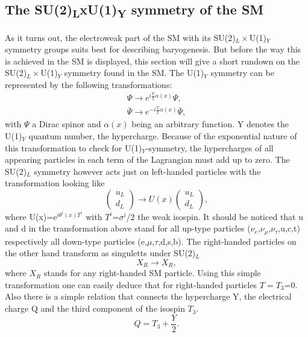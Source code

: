 \subsection{The SU(2)\textsubscript{L}xU(1)\textsubscript{Y} symmetry of the SM}
As it turns out, the electroweak part of the SM with its SU(2)$_L\times$U(1)$_Y$ symmetry groups suits best for describing baryogenesis. But before the way this is achieved in the SM is displayed, this section will give a short rundown on the SU(2)$_L\times$U(1)$_Y$ symmetry found in the SM.\newline\indent
The U(1)$_Y$ symmetry can be represented by the following transformations:
\begin{align*}
\Psi \longrightarrow e^{i\frac{Y}{2}\alpha(x)}\Psi,\\
\bar{\Psi} \longrightarrow e^{-i\frac{Y}{2}\alpha(x)}\bar{\Psi},
\end{align*}
with $\Psi$ a Dirac spinor and $\alpha(x)$ being an arbitrary function. Y denotes the U(1)$_Y$ quantum number, the hypercharge. Because of the exponential nature of this transformation to check for U(1)$_Y$-symmetry, the hypercharges of all appearing particles in each term of the Lagrangian must add up to zero. \newline\indent
The SU(2)$_L$ symmetry however acts just on left-handed particles with the transformation looking like
\begin{equation*}
	\left(\begin{array}{c}u_L\\d_L\end{array}\right)\longrightarrow U(x)	\left(\begin{array}{c}u_L\\d_L\end{array}\right),
\end{equation*}
where U(x)=e$^{i\theta^i(x)T^i}$ with $T^i$=$\sigma^i$/2 the weak isospin. It should be noticed that u and d in the transformation above stand for all up-type particles ($\nu_e$,$\nu_\mu$,$\nu_\tau$,u,c,t) respectively all down-type particles (e,$\mu$,$\tau$,d,s,b). The right-handed particles on the other hand transform as singuletts under SU(2)$_L$
\begin{equation*}
	X_R\longrightarrow X_R,
\end{equation*}
where $X_R$ stands for any right-handed SM particle. Using this simple transformation one can easily deduce that for right-handed particles $T=T_3$=0.\newline\indent
Also there is a simple relation that connects the hypercharge Y, the electrical charge Q and the third component of the isospin $T_3$.
\begin{equation}
Q=T_3+\frac{Y}{2}
\label{eq:ladung_hyperladung_isospin}.
\end{equation}
